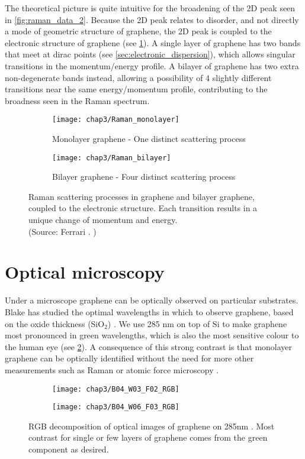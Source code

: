 \documentclass[../Matt_Gebert_Honours_Thesis.tex]{subfiles}
\begin{document}
The theoretical picture is quite intuitive for the broadening of the 2D peak seen in \cref{fig:raman_data_2}. Because the 2D peak relates to disorder, and not directly a mode of geometric structure of graphene, the 2D peak is coupled to the electronic structure of graphene (see \cref{fig:raman_graphene}). A single layer of graphene has two bands that meet at dirac points (see \cref{sec:electronic_dispersion}), which allows singular transitions in the momentum/energy profile. A bilayer of graphene has two extra non-degenerate bands instead, allowing a possibility of 4 slightly different transitions near the same energy/momentum profile, contributing to the broadness seen in the Raman spectrum.
\begin{figure}[H]
	\vspace{-0.5cm}
	\begin{subfigure}[t]{0.6\textwidth}
		\centering
		\texttt{[image: chap3/Raman\_monolayer]}
		\caption{Monolayer graphene - One distinct scattering process}
	\end{subfigure}
	\begin{subfigure}[t]{0.4\textwidth}
		\centering
		\texttt{[image: chap3/Raman\_bilayer]}
		\caption{Bilayer graphene - Four distinct scattering process}
	\end{subfigure}
	\caption[Raman processes in graphene]{Raman scattering processes in graphene and bilayer graphene, coupled to the electronic structure. Each transition results in a unique change of momentum and energy. \\(Source: Ferrari \etal. \cite{ferrari_raman_2006})}\label{fig:raman_graphene}
\end{figure}

\section{Optical microscopy}
Under a microscope graphene can be optically observed on particular substrates. Blake  has studied the optimal wavelengths in which to observe graphene, based on the oxide thickness (SiO$_2$) \cite{blake_making_2007}. We use 285 nm \silicondioxide{} on top of Si to make graphene most pronounced in green wavelengths, which is also the most sensitive colour to the human eye (see \cref{fig:rgb}). A consequence of this strong contrast is that monolayer graphene can be optically identified without the need for more other measurements such as Raman or atomic force microscopy \cite{li_rapid_2013,wang_thickness_2012}. 
\begin{figure}
	\centering
	\begin{subfigure}{0.48\textwidth}
		\texttt{[image: chap3/B04\_W03\_F02\_RGB]}
	\end{subfigure}
	\begin{subfigure}{0.48\textwidth}
		\texttt{[image: chap3/B04\_W06\_F03\_RGB]}
	\end{subfigure}
	\caption[RGB images of graphene on 285nm \silicondioxide{}]{RGB decomposition of optical images of graphene on 285nm \silicondioxide{}. Most contrast for single or few layers of graphene comes from the green component as desired.}\label{fig:rgb}
\end{figure}
\end{document}
